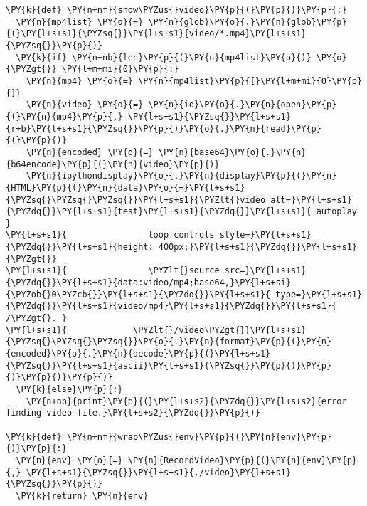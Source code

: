    \begin{tcolorbox}[breakable, size=fbox, boxrule=1pt, pad at break*=1mm,colback=cellbackground, colframe=cellborder]
\begin{Verbatim}[commandchars=\\\{\}]
\PY{k}{def} \PY{n+nf}{show\PYZus{}video}\PY{p}{(}\PY{p}{)}\PY{p}{:}
  \PY{n}{mp4list} \PY{o}{=} \PY{n}{glob}\PY{o}{.}\PY{n}{glob}\PY{p}{(}\PY{l+s+s1}{\PYZsq{}}\PY{l+s+s1}{video/*.mp4}\PY{l+s+s1}{\PYZsq{}}\PY{p}{)}
  \PY{k}{if} \PY{n+nb}{len}\PY{p}{(}\PY{n}{mp4list}\PY{p}{)} \PY{o}{\PYZgt{}} \PY{l+m+mi}{0}\PY{p}{:}
    \PY{n}{mp4} \PY{o}{=} \PY{n}{mp4list}\PY{p}{[}\PY{l+m+mi}{0}\PY{p}{]}
    \PY{n}{video} \PY{o}{=} \PY{n}{io}\PY{o}{.}\PY{n}{open}\PY{p}{(}\PY{n}{mp4}\PY{p}{,} \PY{l+s+s1}{\PYZsq{}}\PY{l+s+s1}{r+b}\PY{l+s+s1}{\PYZsq{}}\PY{p}{)}\PY{o}{.}\PY{n}{read}\PY{p}{(}\PY{p}{)}
    \PY{n}{encoded} \PY{o}{=} \PY{n}{base64}\PY{o}{.}\PY{n}{b64encode}\PY{p}{(}\PY{n}{video}\PY{p}{)}
    \PY{n}{ipythondisplay}\PY{o}{.}\PY{n}{display}\PY{p}{(}\PY{n}{HTML}\PY{p}{(}\PY{n}{data}\PY{o}{=}\PY{l+s+s1}{\PYZsq{}\PYZsq{}\PYZsq{}}\PY{l+s+s1}{\PYZlt{}video alt=}\PY{l+s+s1}{\PYZdq{}}\PY{l+s+s1}{test}\PY{l+s+s1}{\PYZdq{}}\PY{l+s+s1}{ autoplay }
\PY{l+s+s1}{                loop controls style=}\PY{l+s+s1}{\PYZdq{}}\PY{l+s+s1}{height: 400px;}\PY{l+s+s1}{\PYZdq{}}\PY{l+s+s1}{\PYZgt{}}
\PY{l+s+s1}{                \PYZlt{}source src=}\PY{l+s+s1}{\PYZdq{}}\PY{l+s+s1}{data:video/mp4;base64,}\PY{l+s+si}{\PYZob{}0\PYZcb{}}\PY{l+s+s1}{\PYZdq{}}\PY{l+s+s1}{ type=}\PY{l+s+s1}{\PYZdq{}}\PY{l+s+s1}{video/mp4}\PY{l+s+s1}{\PYZdq{}}\PY{l+s+s1}{ /\PYZgt{}. }
\PY{l+s+s1}{             \PYZlt{}/video\PYZgt{}}\PY{l+s+s1}{\PYZsq{}\PYZsq{}\PYZsq{}}\PY{o}{.}\PY{n}{format}\PY{p}{(}\PY{n}{encoded}\PY{o}{.}\PY{n}{decode}\PY{p}{(}\PY{l+s+s1}{\PYZsq{}}\PY{l+s+s1}{ascii}\PY{l+s+s1}{\PYZsq{}}\PY{p}{)}\PY{p}{)}\PY{p}{)}\PY{p}{)}
  \PY{k}{else}\PY{p}{:} 
    \PY{n+nb}{print}\PY{p}{(}\PY{l+s+s2}{\PYZdq{}}\PY{l+s+s2}{error finding video file.}\PY{l+s+s2}{\PYZdq{}}\PY{p}{)}

\PY{k}{def} \PY{n+nf}{wrap\PYZus{}env}\PY{p}{(}\PY{n}{env}\PY{p}{)}\PY{p}{:}
  \PY{n}{env} \PY{o}{=} \PY{n}{RecordVideo}\PY{p}{(}\PY{n}{env}\PY{p}{,} \PY{l+s+s1}{\PYZsq{}}\PY{l+s+s1}{./video}\PY{l+s+s1}{\PYZsq{}}\PY{p}{)}
  \PY{k}{return} \PY{n}{env}
\end{Verbatim}
\end{tcolorbox}

    \hypertarget{q-learning}{%
\section{\texorpdfstring{}{Q-Learning}}\label{q-learning}}


